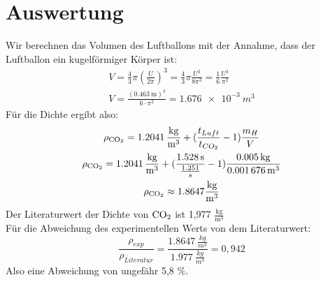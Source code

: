 \documentclass{article}
\begin{document}
    \section{Auswertung}
        Wir berechnen das Volumen des Luftballons mit der Annahme, dass der Luftballon ein kugelförmiger Körper ist:
        \begin{equation}\label{eq:volumen}
            \begin{gathered}
                V = \frac{4}{3} \pi {\left( \frac{U}{2 \pi} \right) }^3 = \frac{4}{3} \pi \frac{U^3}{8 \pi^3} = \frac{1}{6} \frac{U^3}{\pi^2} \\
                V = \frac{ {( \SI{0.463}{\metre} )}^3 }{ 6 \cdot \pi^2} = \SI{1.676e-3}{m^3}
            \end{gathered}
        \end{equation}
        Für die Dichte ergibt also:
        \begin{equation}
            \begin{gathered}
                \rho_{\ce{CO2}} = \SI{ 1.2041 }{ \frac{kg}{m^3} } + (\frac{t_{Luft}}{t_{CO_2}} - 1)\frac{m_H}{V} \\
                \rho_{\ce{CO2}} = \SI{ 1.2041 }{ \frac{kg}{m^3} } + (\frac{ \SI{1.528}{s} }{ \frac{1.251}{s} } - 1) \frac{ \SI{0.005}{\kilogram} }{ \SI{0.001676}{m^3} } \\
                \rho_{\ce{CO2}} \approx 1.8647 \unit{ \frac{kg}{m^3} }
            \end{gathered}
        \end{equation}
        Der Literaturwert der Dichte von \( \ce{CO2} \) ist 1,977 \( \frac{ \unit{\kilogram} }{ {\unit{\metre}}^3 } \) \\
        Für die Abweichung des experimentellen Werts von dem Literaturwert: \\
        \begin{equation}
            \frac{\rho_{exp}}{\rho_{Literatur}} = \frac{ \SI{ 1.8647 }{ \frac{kg}{m^3} } }{ \SI{1.977}{ \frac{kg}{m^3} }  } = 0,942
        \end{equation}
        Also eine Abweichung von ungefähr 5,8 \%.
            
\end{document}
